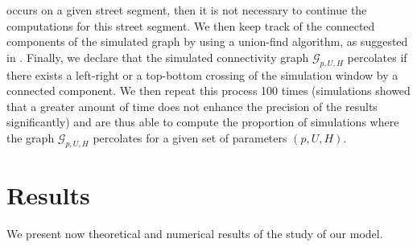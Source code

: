 \documentclass[conference]{IEEEtran}
\begin{document}
occurs on a given street segment, then it is not necessary to continue the computations for this street segment. We then keep track of the connected components of the simulated graph by using a union-find algorithm, as suggested in \cite{newman2001fast}. Finally, we declare that the simulated connectivity graph $\mathcal{G}_{p,U,H}$ percolates if there exists a left-right or a top-bottom crossing of the simulation window by a connected component. We then repeat this process 100 times (simulations showed that a greater amount of time does not enhance the precision of the results significantly) and are thus able to compute the proportion of simulations where the graph $\mathcal{G}_{p,U,H}$ percolates for a given set of parameters $(p,U,H)$.  \\
\indent 


\section{Results}
\label{s.Results}
We present now theoretical and numerical results of the study of our model.
\end{document}
